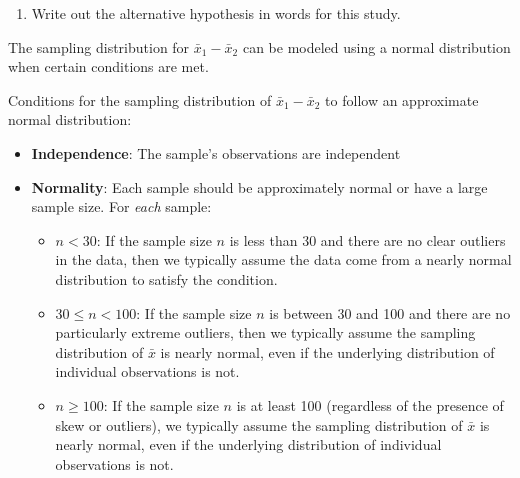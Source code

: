 \documentclass[
]{report}
\providecommand{\tightlist}{%
  \setlength{\itemsep}{0pt}\setlength{\parskip}{0pt}}
\begin{document}
\vspace{0.4in}

\begin{enumerate}
\def\labelenumi{\arabic{enumi}.}
\setcounter{enumi}{2}
\tightlist
\item
  Write out the alternative hypothesis in words for this study.
\end{enumerate}

\vspace{0.8in}

The sampling distribution for \(\bar{x}_1-\bar{x}_2\) can be modeled using a normal distribution when certain conditions are met.

Conditions for the sampling distribution of \(\bar{x}_1-\bar{x}_2\) to follow an approximate normal distribution:

\begin{itemize}
\item
  \textbf{Independence}: The sample's observations are independent
\item
  \textbf{Normality}: Each sample should be approximately normal or have a large sample size. For \emph{each} sample:

  \begin{itemize}
  \item
    \(n < 30\): If the sample size \(n\) is less than 30 and there are no clear outliers in the data, then we typically assume the data come from a nearly normal distribution to satisfy the condition.
  \item
    \(30 \le n < 100\): If the sample size \(n\) is between 30 and 100 and there are no particularly extreme outliers, then we typically assume the sampling distribution of \(\bar{x}\) is nearly normal, even if the underlying distribution of individual observations is not.
  \item
    \(n \geq 100\): If the sample size \(n\) is at least 100 (regardless of the presence of skew or outliers), we typically assume the sampling distribution of \(\bar{x}\) is nearly normal, even if the underlying distribution of individual observations is not.
  \end{itemize}
\end{itemize}
\end{document}
